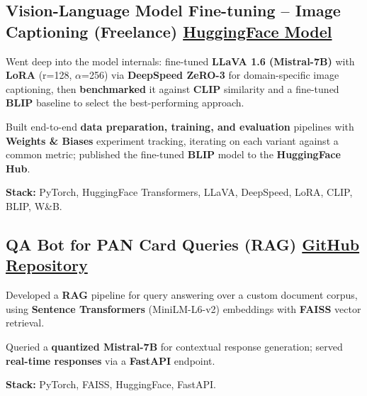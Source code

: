 \documentclass[letter,10pt]{article}
\begin{document}
\subsection{Vision-Language Model Fine-tuning – Image Captioning (Freelance) \hfill \href{https://huggingface.co/sunil448832/blip-model}{HuggingFace Model}}
\begin{zitemize}
\item Went deep into the model internals: fine-tuned \textbf{LLaVA 1.6 (Mistral-7B)} with \textbf{LoRA} (r=128, $\alpha$=256) via \textbf{DeepSpeed ZeRO-3} for domain-specific image captioning, then \textbf{benchmarked} it against \textbf{CLIP} similarity and a fine-tuned \textbf{BLIP} baseline to select the best-performing approach.
\item Built end-to-end \textbf{data preparation, training, and evaluation} pipelines with \textbf{Weights \& Biases} experiment tracking, iterating on each variant against a common metric; published the fine-tuned \textbf{BLIP} model to the \textbf{HuggingFace Hub}.
\item \textbf{Stack:} PyTorch, HuggingFace Transformers, LLaVA, DeepSpeed, LoRA, CLIP, BLIP, W\&B.
\end{zitemize}

\subsection{QA Bot for PAN Card Queries (RAG) \hfill \href{https://github.com/sunil448832/Natural-Language-Processing/tree/master/RAG(Retrieval\%20Augment\%20Generation)}{GitHub Repository}}
\begin{zitemize}
\item Developed a \textbf{RAG} pipeline for query answering over a custom document corpus, using \textbf{Sentence Transformers} (MiniLM-L6-v2) embeddings with \textbf{FAISS} vector retrieval.
\item Queried a \textbf{quantized Mistral-7B} for contextual response generation; served \textbf{real-time responses} via a \textbf{FastAPI} endpoint.
\item \textbf{Stack:} PyTorch, FAISS, HuggingFace, FastAPI.
\end{zitemize}
\end{document}
